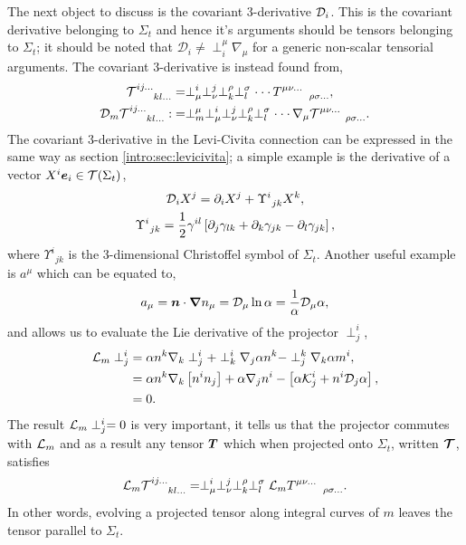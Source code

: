 The next object to discuss is the covariant 3-derivative $\mathcal{D}_i$. This is the covariant derivative belonging to $\Sigma_t$ and hence it's arguments should be tensors belonging to $\Sigma_t$; it should be noted that $\mathcal{D}_i  \neq \perp^\mu_i \nabla_\mu$ for a generic non-scalar tensorial arguments. The covariant 3-derivative is instead found from,
\begin{align} {\mathcal{T}}^{ij ...}_{\;\;\;\;\;\;\;kl ...} &=\perp^{i}_{\mu}\perp^{j}_{\nu}\perp^{\rho}_{k}\perp^{\sigma}_{l}\cdot\cdot\cdot\, T^{\mu\nu ...}_{\;\;\;\;\;\;\;\;\;\;\rho\sigma ...},\\
  \mathcal{D}_m  {\mathcal{T}}^{ij ...}_{\;\;\;\;\;\;\;kl ...} :&=   \perp^\mu_m  \perp^{i}_{\mu}\perp^{j}_{\nu}\perp^{\rho}_{k}\perp^{\sigma}_{l}\cdot\cdot\cdot\, \nabla_\mu{\mathcal{T}}^{\mu\nu ...}_{\;\;\;\;\;\;\;\;\;\;\rho\sigma ...}.\end{align}
The covariant 3-derivative in the Levi-Civita connection can be expressed in the same way as section \ref{intro:sec:levicivita}; a simple example is the derivative of a vector $X^i \boldsymbol{e}_i \in \mathcal{T}(\Sigma_t)$,
\begin{gather} \mathcal{D}_i X^j = \partial_i X^j + \Upsilon^i_{\;\,jk}X^k,\\
\Upsilon^i_{\;\,jk} = \frac{1}{2}\gamma^{il}\left[ \partial_{j}\gamma_{lk} + \partial_{k}\gamma_{jk} -\partial_{l}\gamma_{jk} \right],\label{nr:eq:3connection}\end{gather}
where $\Upsilon^i_{\;\,jk}$ is the 3-dimensional Christoffel symbol of $\Sigma_t$. Another useful example is $a^\mu$ which can be equated to,
\begin{equation}\label{nr:eq:dlnalpha} a_\mu = \boldsymbol{n}\cdot \boldsymbol{\nabla} n_\mu = \mathcal{D}_\mu \ln \alpha = \frac{1}{\alpha}\mathcal{D}_\mu \alpha,\end{equation}
and allows us to evaluate the Lie derivative of the projector $\perp^i_j$,
\begin{align}
\mathcal{L}_m \perp^i_j &= \alpha n^k \nabla_k \perp^i_j + \perp^i_k \nabla_j \alpha n^k - \perp^k_j \nabla_k \alpha m^i,  \\
&= \alpha n^k \nabla_k \left[ n^i n_j\right]  + \alpha \nabla_j n^i - \left[ \alpha \mathcal{K}_j^i + n^i \mathcal{D}_j \alpha\right], \\
&= 0.
\end{align}
The result $\mathcal{L}_m \perp^i_j=0$ is very important, it tells us that the projector commutes with $\mathcal{L}_m$ and as a result any tensor $\boldsymbol{T}$ which when projected onto $\Sigma_t$, written $\boldsymbol{\mathcal{T}}$, satisfies
\begin{equation}  \label{nr:eq:LmT}\mathcal{L}_m {\mathcal{T}}^{ij ...}_{\;\;\;\;\;\;\;kl ...} =   \perp^{i}_{\mu}\perp^{j}_{\nu}\perp^{\rho}_{k}\perp^{\sigma}_{l}\mathcal{L}_m{{T}}^{\mu\nu ...}_{\;\;\;\;\;\;\;\;\;\;\rho\sigma ...}.\end{equation}
In other words, evolving a projected tensor along integral curves of $m$ leaves the tensor parallel to $\Sigma_t$.



